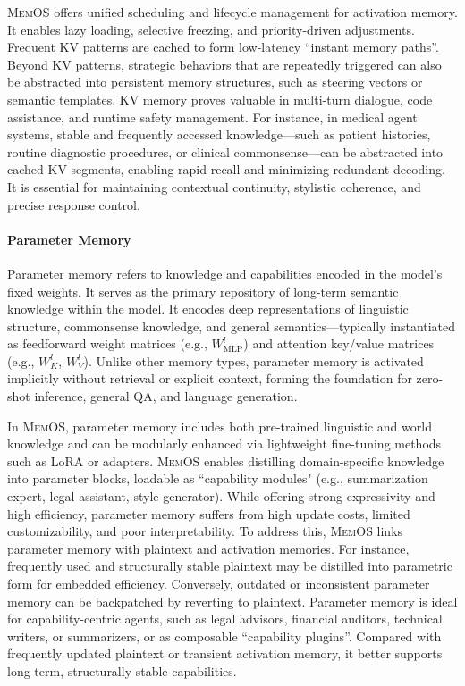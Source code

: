 \documentclass[]{memtensor}
\begin{document}
\textsc{MemOS} offers unified scheduling and lifecycle management for activation memory.
It enables lazy loading, selective freezing, and priority-driven adjustments.
Frequent KV patterns are cached to form low-latency “instant memory paths”.
Beyond KV patterns, strategic behaviors that are repeatedly triggered can also be abstracted into persistent memory structures, such as steering vectors or semantic templates.
KV memory proves valuable in multi-turn dialogue, code assistance, and runtime safety management. 
For instance, in medical agent systems, stable and frequently accessed knowledge—such as patient histories, routine diagnostic procedures, or clinical commonsense—can be abstracted into cached KV segments, enabling rapid recall and minimizing redundant decoding.
It is essential for maintaining contextual continuity, stylistic coherence, and precise response control.

\paragraph{\textbf{Parameter Memory}}
Parameter memory refers to knowledge and capabilities encoded in the model’s fixed weights. It serves as the primary repository of long-term semantic knowledge within the model.
It encodes deep representations of linguistic structure, commonsense knowledge, and general semantics—typically instantiated as feedforward weight matrices (e.g., $W^l_{\text{MLP}}$) and attention key/value matrices (e.g., $W^l_K$, $W^l_V$).
Unlike other memory types, parameter memory is activated implicitly without retrieval or explicit context, forming the foundation for zero-shot inference, general QA, and language generation.

In \textsc{MemOS}, parameter memory includes both pre-trained linguistic and world knowledge and can be modularly enhanced via lightweight fine-tuning methods such as LoRA or adapters.
\textsc{MemOS} enables distilling domain-specific knowledge into parameter blocks, loadable as ``capability modules" (e.g., summarization expert, legal assistant, style generator).
While offering strong expressivity and high efficiency, parameter memory suffers from high update costs, limited customizability, and poor interpretability.
To address this, \textsc{MemOS} links parameter memory with plaintext and activation memories.
For instance, frequently used and structurally stable plaintext may be distilled into parametric form for embedded efficiency.
Conversely, outdated or inconsistent parameter memory can be backpatched by reverting to plaintext.
Parameter memory is ideal for capability-centric agents, such as legal advisors, financial auditors, technical writers, or summarizers, or as composable “capability plugins”.
Compared with frequently updated plaintext or transient activation memory, it better supports long-term, structurally stable capabilities.
\end{document}
